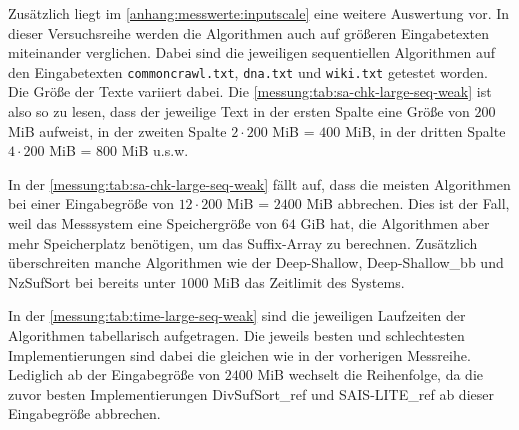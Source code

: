 Zusätzlich liegt im \cref{anhang:messwerte:inputscale} eine weitere Auswertung vor. In dieser Versuchsreihe werden die Algorithmen auch auf größeren Eingabetexten miteinander verglichen. Dabei sind die jeweiligen sequentiellen Algorithmen auf den Eingabetexten \texttt{commoncrawl.txt}, \texttt{dna.txt} und \texttt{wiki.txt} getestet worden. Die Größe der Texte variiert dabei. Die \cref{messung:tab:sa-chk-large-seq-weak} ist also so zu lesen, dass der jeweilige Text in der ersten Spalte eine Größe von $200$ MiB aufweist, in der zweiten Spalte $2\cdot200$ MiB = $400$ MiB, in der dritten Spalte $4\cdot200$ MiB = $800$ MiB u.s.w.

In der \cref{messung:tab:sa-chk-large-seq-weak} fällt auf, dass die meisten Algorithmen bei einer Eingabegröße von $12\cdot200$ MiB = $2400$ MiB abbrechen. Dies ist der Fall, weil das Messsystem eine Speichergröße von $64$ GiB hat, die Algorithmen aber mehr Speicherplatz benötigen, um das Suffix-Array zu berechnen. Zusätzlich überschreiten manche Algorithmen wie der Deep-Shallow, Deep-Shallow\_bb und NzSufSort bei bereits unter $1000$ MiB das Zeitlimit des Systems.

In der \cref{messung:tab:time-large-seq-weak} sind die jeweiligen Laufzeiten der Algorithmen tabellarisch aufgetragen. Die jeweils besten und schlechtesten Implementierungen sind dabei die gleichen wie in der vorherigen Messreihe. Lediglich ab der Eingabegröße von $2400$ MiB wechselt die Reihenfolge, da die zuvor besten Implementierungen DivSufSort\_ref und SAIS-LITE\_ref ab dieser Eingabegröße abbrechen.